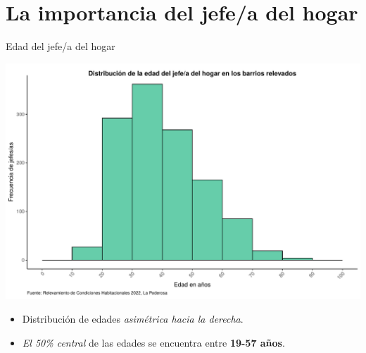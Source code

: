 \documentclass[aspectratio=169]{beamer}
\begin{document}
    \section{La importancia del jefe/a del hogar}
    \begin{frame}
        \tableofcontents[currentsection]
    \end{frame} 

    \begin{frame}{Edad del jefe/a del hogar}
         \begin{minipage}{.65\linewidth}
            \begin{overlayarea}{\linewidth}{.75\textheight}
                \includegraphics[height=.75\textheight]{graficas-pdf/histograma-edad-jefe.pdf}
            \end{overlayarea}
        \end{minipage}
        \begin{minipage}{.34\linewidth}
            \setlength{\leftmargini}{12pt}
            \begin{itemize}
                \item<2-> Distribución de edades \textit{asimétrica hacia la derecha}.

                \item<4-> \textit{El 50\% central} de las edades se encuentra entre \textbf{19-57 años}.

            \end{itemize}
        \end{minipage}
    \end{frame}
\end{document}
